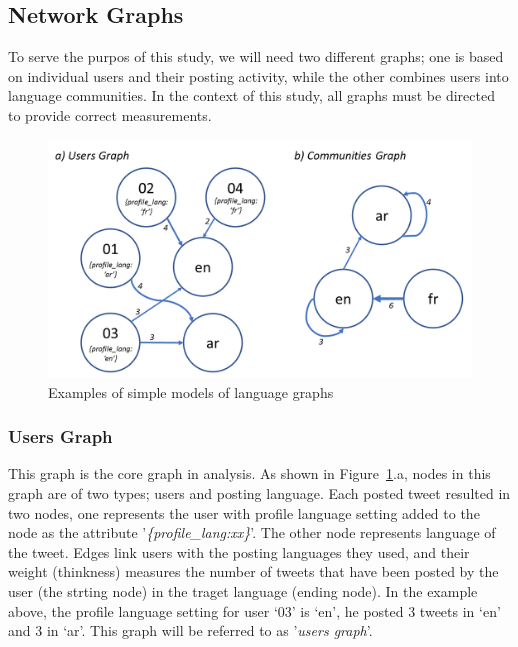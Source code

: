 \documentclass{llncs}
\begin{document}


\subsection{Network Graphs}\label{netgraphs}

To serve the purpos of this study, we will need two different graphs;
one is based on individual users and their posting activity, while the
other combines users into language communities. In the
context of this study, all graphs must be directed to provide correct
measurements.

\begin{figure}[htb]
\centering
\includegraphics[width=0.8\columnwidth]{images/graphstructures.png}
\caption{Examples of simple models of language graphs}
\label{fig:graphstructures}
\end{figure}

\subsubsection{Users Graph}

This graph is the core graph in analysis. As shown in
Figure~\ref{fig:graphstructures}.a, nodes in this graph are of two
types; users and posting language. Each posted tweet resulted in two
nodes, one represents the user with profile language setting added to
the node as the attribute '{\emph{\{profile\_lang:xx\}}}'. The other
node represents language of the tweet. Edges link users with the
posting languages they used, and their weight (thinkness) measures the
number of tweets that have been posted by the user (the strting node)
in the traget language (ending node).  In the example above, the
profile language setting for user `03' is `en', he posted 3 tweets in
`en' and 3 in `ar'. This graph will be referred to as '\emph{users
graph}'.
\end{document}
